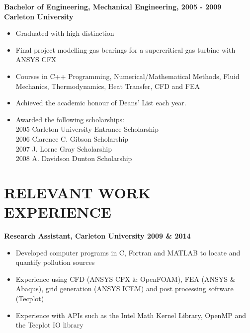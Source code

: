 \documentclass[letterpaper]{res}
\begin{document}
\begin{resume}
{\bf Bachelor of Engineering, Mechanical Engineering, \hfill 2005 - 2009}\\
{\bf Carleton University}
\begin{itemize} \itemsep -2pt
\item Graduated with high distinction
\item Final project modelling gas bearings for a supercritical gas turbine with ANSYS CFX
\item Courses in C++ Programming, Numerical/Mathematical Methods, Fluid Mechanics, Thermodynamics, Heat Transfer, CFD and FEA
\item Achieved the academic honour of Deans' List each year.
\item Awarded the following scholarships: \hfill \\
\hspace{200 mm}2005 Carleton University Entrance Scholarship \\
\hspace{20 mm}2006 Clarence C. Gibson Scholarship \\
\hspace{20 mm}2007 J. Lorne Gray Scholarship \\
\hspace{20 mm}2008 A. Davidson Dunton Scholarship
\end{itemize}

\section{RELEVANT WORK EXPERIENCE}

\vspace{10pt}
{\bf Research Assistant, Carleton University \hfill 2009 \& 2014}
\begin{itemize} \itemsep -2pt
\item Developed computer programs in C, Fortran and MATLAB to locate and quantify pollution sources
\item Experience using CFD (ANSYS CFX \& OpenFOAM), FEA (ANSYS \& Abaqus), grid generation (ANSYS ICEM) and post processing software (Tecplot)
\item Experience with APIs such as the Intel Math Kernel Library, OpenMP and the Tecplot IO library
\end{itemize}


\end{resume}
\end{document}
